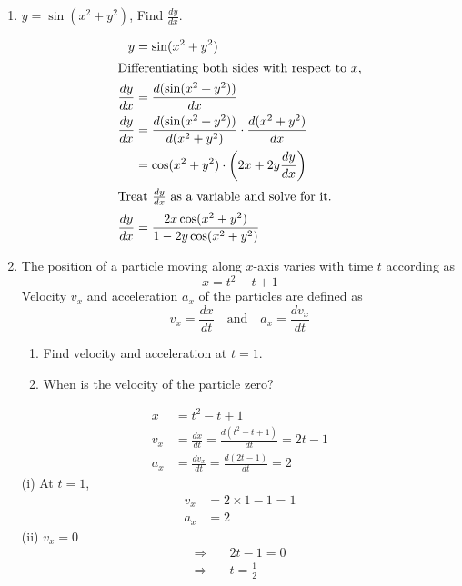 \begin{enumerate}
    \item \(y = \sin (x^2 + y^2)\), Find \(\frac{dy}{dx}\).
    \begin{solution}
        \begin{align*}
            y &= \sin (x^2 + y^2)\\
            \intertext{Differentiating both sides with respect to \(x\),}
            \frac{dy}{dx} &= \frac{d (\sin (x^2 + y^2))}{dx} \\
            \frac{dy}{dx} &= \frac{d (\sin (x^2 + y^2))}{d (x^2 + y^2)} \cdot \frac{d (x^2 + y^2)}{dx} \\
        &= \cos (x^2 + y^2) \cdot \left( 2x + 2y \frac{dy}{dx} \right)\\
        \intertext{Treat \(\frac{dy}{dx}\) as a variable and solve for it.}
        \frac{dy}{dx} &= \frac{2x \cos (x^2 + y^2)}{1 - 2y \cos (x^2 + y^2)}
        \end{align*}
    \end{solution}
    \BgThispage
    \item The position of a particle moving along \(x\)-axis varies with time \( t \) according as \[x = t^2 - t + 1\] Velocity \( v_x \) and acceleration \( a_x \) of the particles are defined as \[v_x = \frac{dx}{dt} \quad \text{and} \quad a_x = \frac{dv_x}{dt}\]
    \begin{enumerate}
        \item Find velocity and acceleration at \( t = 1 \).
        \item When is the velocity of the particle zero?
    \end{enumerate}
        \begin{solution}
            \begin{align*}
                x &= t^2 - t + 1\\
                v_x &= \frac{dx}{dt} = \frac{d(t^2 - t + 1)}{dt} = 2t - 1\\
                a_x &= \frac{dv_x}{dt} = \frac{d(2t - 1)}{dt} = 2
            \end{align*}
            (i) At \( t = 1 \),
            \begin{align*}
                v_x &= 2 \times 1 - 1 = 1\\
                a_x &= 2
            \end{align*}
            (ii) \( v_x = 0 \)
            \begin{align*}
                \Rightarrow & \quad 2t - 1 = 0 \\
                \Rightarrow & \quad t = \frac{1}{2}\\
            \end{align*}
        \end{solution}



\end{enumerate}
